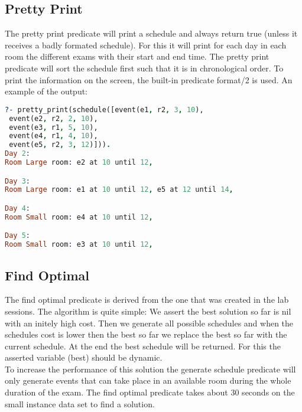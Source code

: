 \documentclass[11pt]{article}
\begin{document}
\subsection{Pretty Print}
The pretty print predicate will print a schedule and always return true (unless it receives a badly formated schedule). For this it will print for each day in each room the different exams with their start and end time. The pretty print predicate will sort the schedule first such that it is in chronological order. To print the information on the screen, the built-in predicate format/2 is used. An example of the output:
\begin{lstlisting}[basicstyle=\small,language=prolog]
?- pretty_print(schedule([event(e1, r2, 3, 10),
 event(e2, r2, 2, 10),
 event(e3, r1, 5, 10),
 event(e4, r1, 4, 10),
 event(e5, r2, 3, 12)])).
Day 2: 
Room Large room: e2 at 10 until 12, 

Day 3: 
Room Large room: e1 at 10 until 12, e5 at 12 until 14, 

Day 4: 
Room Small room: e4 at 10 until 12, 

Day 5: 
Room Small room: e3 at 10 until 12, 
\end{lstlisting}

\subsection{Find Optimal}
The find optimal predicate is derived from the one that was created in the lab sessions. The algorithm is quite simple: We assert the best solution so far is nil with an initely high cost. Then we generate all possible schedules and when the schedules cost is lower then the best so far we replace the best so far with the current schedule. At the end the best schedule will be returned. For this the asserted variable (best) should be dynamic.\\
To increase the performance of this solution the generate schedule predicate will only generate events that can take place in an available room during the whole duration of the exam. The find optimal predicate takes about 30 seconds on the small instance data set to find a solution.
\end{document}
